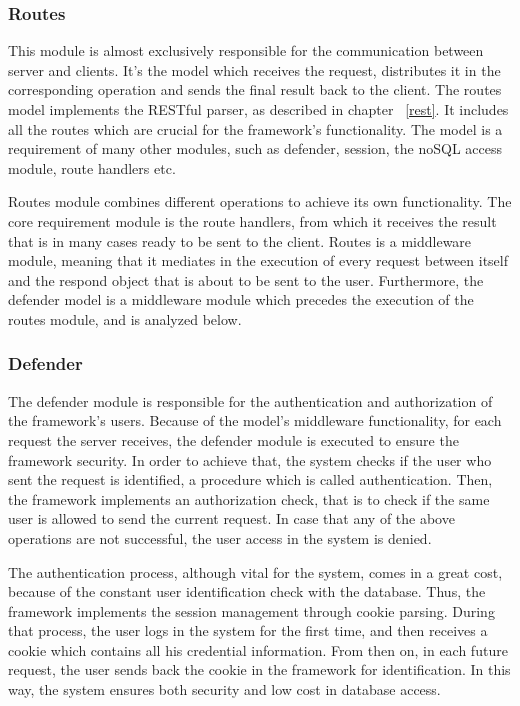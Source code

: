 \subsubsection{Routes}
This module is almost exclusively responsible for the communication between server and clients. It's the model which receives the request, distributes it in the corresponding operation and sends the final result back to the client. The routes model implements the RESTful parser, as described in chapter ~\ref{rest}. It includes all the routes which are crucial for the framework's functionality. The model is a requirement of many other modules, such as defender, session, the noSQL access module, route handlers etc.\par
Routes module combines different operations to achieve its own functionality. The core requirement module is the route handlers, from which it receives the result that is in many cases ready to be sent to the client. Routes is a middleware module, meaning that it mediates in the execution of every request between itself and the respond object that is about to be sent to the user. Furthermore, the defender model is a middleware module which precedes the execution of the routes module, and is analyzed below.

\subsubsection{Defender}
\label{def}
The defender module is responsible for the authentication and authorization of the framework's users. Because of the model's middleware functionality, for each request the server receives, the defender module is executed to ensure the framework security. In order to achieve that, the system checks if the user who sent the request is identified, a procedure which is called authentication. Then, the framework implements an authorization check, that is to check if the same user is allowed to send the current request. In case that any of the above operations are not successful, the user access in the system is denied. \par
	The authentication process, although vital for the system, comes in a great cost, because of the constant user identification check with the database. Thus, the framework implements the session management through cookie parsing. During that process, the user logs in the system for the first time, and then receives a cookie which contains all his credential information. From then on, in each future request, the user sends back the cookie in the framework for identification. In this way, the system ensures both security and low cost in database access.


